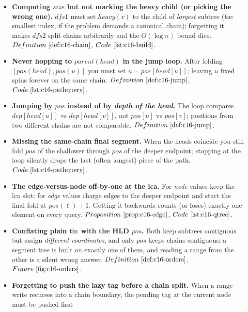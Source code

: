 \begin{itemize}[nosep, leftmargin=1.4em]
  \item \textbf{Computing \(\mathit{size}\) but not marking the heavy child (or picking the
        wrong one).} \(\mathit{dfs1}\) must set \(\mathit{heavy}(v)\) to the child of
        \emph{largest} subtree (tie: smallest index, if the problem demands a canonical chain);
        forgetting it makes \(\mathit{dfs2}\) split chains arbitrarily and the \(O(\log n)\)
        bound dies. \(\defref{c16-chain}\), \(\coderef{c16-build}\).
  \item \textbf{Never hopping to \(\mathit{parent}(\mathit{head})\) in the jump loop.} After
        folding \([\mathit{pos}(\mathit{head}),\mathit{pos}(u)]\) you must set \(u=
        \mathit{par}[\mathit{head}[u]]\); leaving \(u\) fixed spins forever on the same chain.
        \(\defref{c16-jump}\), \(\coderef{c16-pathquery}\).
  \item \textbf{Jumping by \(\mathit{pos}\) instead of by \emph{depth of the head}.} The loop
        compares \(\mathit{dep}[\mathit{head}[u]]\) vs \(\mathit{dep}[\mathit{head}[v]]\), not
        \(\mathit{pos}[u]\) vs \(\mathit{pos}[v]\); positions from two different chains are not
        comparable. \(\defref{c16-jump}\).
  \item \textbf{Missing the same-chain final segment.} When the heads coincide you still fold
        \(\mathit{pos}\) of the shallower through \(\mathit{pos}\) of the deeper endpoint;
        stopping at the loop silently drops the last (often longest) piece of the path. \(\coderef{c16-pathquery}\).
  \item \textbf{The edge-versus-node off-by-one at the lca.} For \emph{node} values keep the
        lca slot; for \emph{edge} values charge edges to the deeper endpoint and start the final
        fold at \(\mathit{pos}(\ell)+1\). Getting it backwards counts (or loses) exactly one
        element on every query. \(\propref{c16-edge}\), \(\coderef{c16-qtree}\).
  \item \textbf{Conflating plain \(\operatorname{tin}\) with the HLD \(\mathit{pos}\).} Both keep subtrees
        contiguous but assign \emph{different coordinates}, and only \(\mathit{pos}\) keeps chains
        contiguous; a segment tree is built on exactly one of them, and reading a range from the
        other is a silent wrong answer. \(\defref{c16-orders}\), \(\figref{c16-orders}\).
  \item \textbf{Forgetting to push the lazy tag before a chain split.} When a range-write
        recurses into a chain boundary, the pending tag at the current node must be pushed first

\end{itemize}
